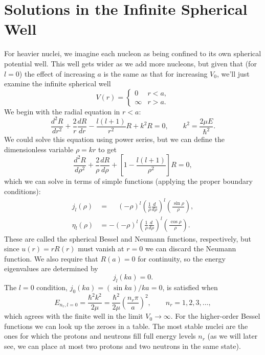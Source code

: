 \documentclass[../p116main.tex]{subfiles}
\begin{document}
\section{Solutions in the Infinite Spherical Well}
For heavier nuclei, we imagine each nucleon as being confined to its own spherical potential well.
This well gets wider as we add more nucleons, but given that (for $l=0$) the effect of increasing $a$ is the same as that for increasing $V_0$, we'll just examine the infinite spherical well
\[ V(r) = \begin{cases} 0 & r < a, \\ \infty & r > a. \end{cases} \]
We begin with the radial equation in $r < a$:
\[ \frac{d^2 R}{dr^2} + \frac{2}{r} \frac{dR}{dr} - \frac{l(l+1)}{r^2} R + k^2 R = 0, \qquad k ^2= \frac{2\mu E}{\hbar^2}. \]
We could solve this equation using power series, but we can define the dimensionless variable $\rho = kr$ to get
\[ \frac{d^2 R}{d \rho^2} + \frac{2}{\rho} \frac{dR}{d \rho} + \left[ 1 - \frac{l(l+1)}{\rho^2} \right] R = 0, \]
which we can solve in terms of simple functions (applying the proper boundary conditions):
\begin{align*}
    j_l(\rho) &= \phantom{-}(-\rho)^{l} \left( \frac{1}{\rho} \frac{d}{d\rho} \right)^{l} \left( \frac{\sin \rho}{\rho} \right), \\
    \eta_l(\rho) &= -(-\rho)^{l} \left( \frac{1}{\rho} \frac{d}{d\rho} \right)^{l} \left( \frac{\cos \rho}{\rho} \right).
\end{align*}
These are called the spherical Bessel and Neumann functions, respectively, but since $u(r) = r R(r)$ must vanish at $r=0$ we can discard the Neumann function.
We also require that $R(a) = 0$ for continuity, so the energy eigenvalues are determined by
\[ j_l(ka) = 0. \]
The $l=0$ condition, $j_0(ka) = (\sin ka) / ka = 0$, is satisfied when
\[ E_{n_r,l=0} = \frac{\hbar^2 k^2}{2\mu} = \frac{\hbar^2}{2\mu} \left( \frac{n_r \pi}{a} \right)^2, \qquad n_r = 1, 2, 3, \ldots, \]
which agrees with the finite well in the limit $V_0 \to \infty$.
For the higher-order Bessel functions we can look up the zeroes in a table.
The most stable nuclei are the ones for which the protons and neutrons fill full energy levels $n_r$ (as we will later see, we can place at most two protons and two neutrons in the same state).
\end{document}
